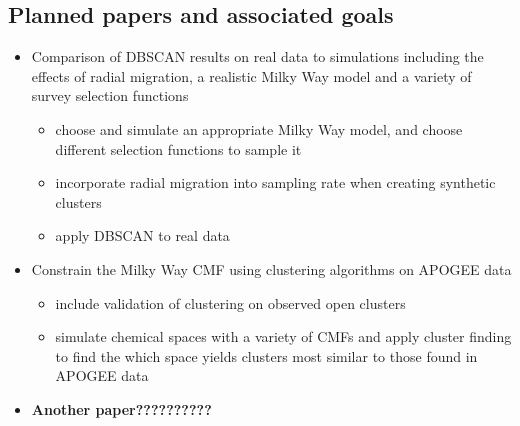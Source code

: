 \documentclass[11pt]{article}
\begin{document}
\subsection*{Planned papers and associated goals}
\begin{itemize}
	\item Comparison of DBSCAN results on real data to simulations including the effects of radial migration, a realistic Milky Way model and a variety of survey selection functions
	\begin{itemize}
	\item choose and simulate an appropriate Milky Way model, and choose different selection functions to sample it
	\item incorporate radial migration into sampling rate when creating synthetic clusters
	\item apply DBSCAN to real data
	\end{itemize}
	\item Constrain the Milky Way CMF using clustering algorithms on APOGEE data
	\begin{itemize}
	\item include validation of clustering on observed open clusters
	\item simulate chemical spaces with a variety of CMFs and apply cluster finding to find the which space yields clusters most similar to those found in APOGEE data
	\end{itemize}
	\item \textbf{Another paper??????????}
\end{itemize}


\end{document}
